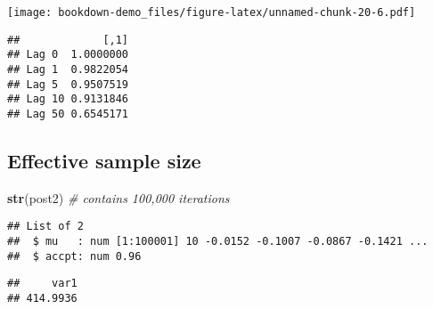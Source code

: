 \documentclass[]{book}
\newenvironment{Shaded}{\begin{snugshade}}{\end{snugshade}}
\newcommand{\KeywordTok}[1]{\textcolor[rgb]{0.13,0.29,0.53}{\textbf{#1}}}
\newcommand{\CommentTok}[1]{\textcolor[rgb]{0.56,0.35,0.01}{\textit{#1}}}
\newcommand{\OperatorTok}[1]{\textcolor[rgb]{0.81,0.36,0.00}{\textbf{#1}}}
\newcommand{\NormalTok}[1]{#1}
\begin{document}
\begin{Shaded}
\end{Shaded}

\texttt{[image: bookdown-demo\_files/figure-latex/unnamed-chunk-20-6.pdf]}

\begin{Shaded}
\end{Shaded}

\begin{verbatim}
##             [,1]
## Lag 0  1.0000000
## Lag 1  0.9822054
## Lag 5  0.9507519
## Lag 10 0.9131846
## Lag 50 0.6545171
\end{verbatim}

\subsection{Effective sample size}\label{effective-sample-size}

\begin{Shaded}
\begin{Highlighting}[]
\KeywordTok{str}\NormalTok{(post2) }\CommentTok{# contains 100,000 iterations}
\end{Highlighting}
\end{Shaded}

\begin{verbatim}
## List of 2
##  $ mu   : num [1:100001] 10 -0.0152 -0.1007 -0.0867 -0.1421 ...
##  $ accpt: num 0.96
\end{verbatim}

\begin{Shaded}
\end{Shaded}

\begin{verbatim}
##     var1 
## 414.9936
\end{verbatim}
\end{document}
